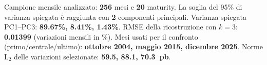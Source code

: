 Campione mensile analizzato: \textbf{256} mesi e \textbf{20} maturity.
La soglia del 95\% di varianza spiegata \`e raggiunta con \textbf{2} componenti principali.
Varianza spiegata PC1--PC3: \textbf{89.67\%, 8.41\%, 1.43\%}.
RMSE della ricostruzione con $k=3$: \textbf{0.01399} (variazioni mensili in \%).
Mesi usati per il confronto (primo/centrale/ultimo): \textbf{ottobre 2004, maggio 2015, dicembre 2025}.
Norme L$_2$ delle variazioni selezionate: \textbf{59.5, 88.1, 70.3~pb}.
